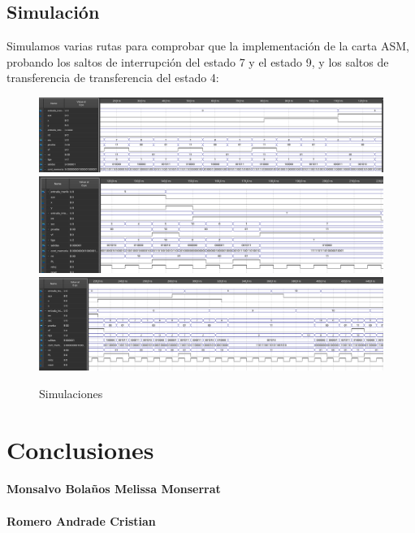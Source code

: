 \documentclass[table]{scrartcl}
\begin{document}
\subsection{Simulación}\label{sec:simulacion}
Simulamos varias rutas para comprobar que la implementación de la
carta ASM, probando los saltos de interrupción del estado 7 y el estado 9, y los
saltos de transferencia de transferencia del estado 4:
\begin{figure}[H]
  \centering
  \includegraphics[width=\textwidth]{./img/sim1}
  \includegraphics[width=\textwidth]{./img/sim2}\\
  \includegraphics[width=\textwidth]{./img/sim3}\\
  \caption{Simulaciones}\label{fig:sim}
\end{figure}

\section{Conclusiones}
\label{sec:conclusiones}

\paragraph{Monsalvo Bolaños Melissa Monserrat}

\paragraph{Romero Andrade Cristian}

\newpage{}
\nocite{*}
\printbibliography{}


\listoftables{}
\listoffigures{}
\listoflistings{}
\end{document}
